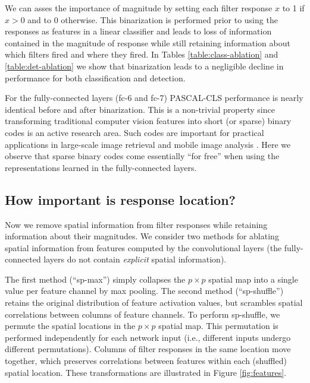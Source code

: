 We can asses the importance of magnitude by setting each filter response $x$ to 1 if $x > 0$ and to $0$ otherwise. This binarization is performed prior to using the responses as features in a linear classifier and leads to loss of information contained in the magnitude of response while still retaining information about which filters fired and where they fired. 
In Tables \ref{table:class-ablation} and \ref{table:det-ablation} we show that binarization leads to a negligible decline in performance for both classification and detection. 

For the fully-connected layers (fc-6 and fc-7) PASCAL-CLS performance is nearly identical before and after binarization.
This is a non-trivial property since transforming traditional computer vision features into short (or sparse) binary codes is an active research area. Such codes are important for practical applications in large-scale image retrieval and mobile image analysis \cite{weiss2009spectral,gong2011iterative}. Here we observe that sparse binary codes come essentially ``for free'' when using the representations learned in the fully-connected layers.

\subsection{How important is response location?}
\label{sub:imp-loc}
Now we remove spatial information from filter responses while retaining information about their magnitudes. We consider two methods for ablating spatial information from features computed by the convolutional layers (the fully-connected layers do not contain \emph{explicit} spatial information).

The first method (``sp-max'') simply collapses the $p \times p$ spatial map into a single value per feature channel by max pooling. The second method (``sp-shuffle'') retains the original distribution of feature activation values, but scrambles spatial correlations between columns of feature channels. To perform sp-shuffle, we permute the spatial locations in the $p \times p$ spatial map. This permutation is performed independently for each network input (i.e., different inputs undergo different permutations). Columns of filter responses in the same location move together, which preserves correlations between features within each (shuffled) spatial location. These transformations are illustrated in Figure \ref{fig:features}.

